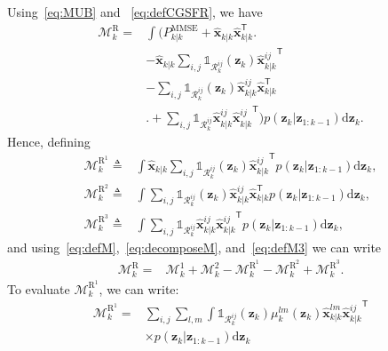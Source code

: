 \documentclass[10pt,twocolumn,twoside]{IEEEtran}
\newcommand{\tran}{^{\mathsf{T}}}
\newcommand{\Pmmse}{P_{k|k}^{\mathrm{MMSE}}}
\newcommand{\corcol}[1]{\textcolor{CorCol}{#1}}
\begin{document}
\corcol{Using~\eqref{eq:MUB} and ~\eqref{eq:defCGSFR}, we have
\begin{align}
\mathcal{M}^{\mathrm{R}}_k=& \int { \bigg( \Pmmse + \mathsf{\hat{\boldsymbol{x}}}_{k|k}\mathsf{\hat{\boldsymbol{x}}}_{k|k}\tran \bigg.}\\
&- \mathsf{\hat{\boldsymbol{x}}}_{k|k} \sum\limits_{i,j} \mathds{1}_{\mathcal{R}^{ij}_k}{\left(\mathbf{z}_k\right)} \mathsf{\hat{\boldsymbol{x}}}{_{k|k}^{ij}}\tran \\
&- \sum\limits_{i,j} \mathds{1}_{\mathcal{R}^{ij}_k}{\left(\mathbf{z}_k\right)} \mathsf{\hat{\boldsymbol{x}}}{_{k|k}^{ij}} \mathsf{\hat{\boldsymbol{x}}}_{k|k} \tran \\
& \bigg.+\sum\limits_{i,j}  \mathds{1}_{\mathcal{R}^{ij}_k} \mathsf{\hat{\boldsymbol{x}}}{_{k|k}^{ij}}\mathsf{\hat{\boldsymbol{x}}}{_{k|k}^{ij}}\tran \bigg)p{\left(\mathbf{{z}}_{k}|\mathbf{{z}}_{1:k-1}\right)}\mathrm{d}\mathbf{{z}}_{k}.
\end{align}
Hence, defining
\begin{align}
\mathcal{M}^{\mathrm{R}^1}_k \triangleq & \int{\mathsf{\hat{\boldsymbol{x}}}_{k|k} \sum\limits_{i,j} \mathds{1}_{\mathcal{R}^{ij}_k}{\left(\mathbf{z}_k\right)} \mathsf{\hat{\boldsymbol{x}}}{_{k|k}^{ij}}\tran}p{\left(\mathbf{{z}}_{k}|\mathbf{{z}}_{1:k-1}\right)}\mathrm{d}\mathbf{{z}}_{k}, \\
\mathcal{M}^{\mathrm{R}^2}_k \triangleq & \int{ \sum\limits_{i,j} \mathds{1}_{\mathcal{R}^{ij}_k}{\left(\mathbf{z}_k\right)} \mathsf{\hat{\boldsymbol{x}}}{_{k|k}^{ij}} \mathsf{\hat{\boldsymbol{x}}}_{k|k} \tran}p{\left(\mathbf{{z}}_{k}|\mathbf{{z}}_{1:k-1}\right)}\mathrm{d}\mathbf{{z}}_{k},\\
\mathcal{M}^{\mathrm{R}^3}_k \triangleq & \int{\sum\limits_{i,j}  \mathds{1}_{\mathcal{R}^{ij}_k} \mathsf{\hat{\boldsymbol{x}}}{_{k|k}^{ij}}\mathsf{\hat{\boldsymbol{x}}}{_{k|k}^{ij}}\tran}p{\left(\mathbf{{z}}_{k}|\mathbf{{z}}_{1:k-1}\right)}\mathrm{d}\mathbf{{z}}_{k},
\end{align}
and using~\eqref{eq:defM},~\eqref{eq:decomposeM}, and~\eqref{eq:defM3} we can write
\begin{align}
\mathcal{M}^{\mathrm{R}}_k=& \mathcal{M}_k^1+\mathcal{M}_k^2 -\mathcal{M}^{\mathrm{R}^1}_k-\mathcal{M}^{\mathrm{R}^2}_k +\mathcal{M}^{\mathrm{R}^3}_k.
\end{align}
To evaluate \(\mathcal{M}^{\mathrm{R}^1}_k\), we can write:
\begin{align}
\nonumber
\mathcal{M}^{\mathrm{R}^1}_k = & \sum\limits_{i,j} \sum\limits_{l,m} \int \mathds{1}_{\mathcal{R}^{ij}_k}{\left(\mathbf{z}_k\right)}\mu_k^{lm}{\left(\mathbf{z}_{k}\right)} \mathsf{\hat{\boldsymbol{x}}}_{k|k}^{lm}\mathsf{\hat{\boldsymbol{x}}}{_{k|k}^{ij}}\tran \\ & \times p{\left(\mathbf{{z}}_{k}|\mathbf{{z}}_{1:k-1}\right)}\mathrm{d}\mathbf{{z}}_{k} \\

\end{align}}
\end{document}
